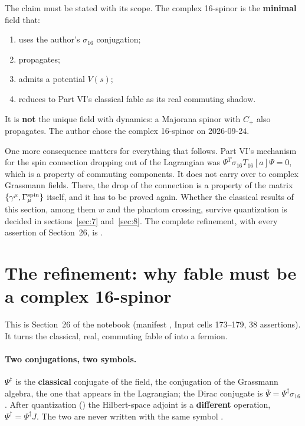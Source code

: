The claim must be stated with its scope. The complex 16-spinor is the \textbf{minimal} field
that:
\begin{enumerate}
  \item uses the author's $\sigma_{16}$ conjugation;
  \item propagates;
  \item admits a potential $V(s)$;
  \item reduces to Part VI's classical fable as its real commuting shadow.
\end{enumerate}
It is \textbf{not} the unique field with dynamics: a Majorana spinor with $C_+$ also propagates.
The author chose the complex 16-spinor on 2026-09-24.

One more consequence matters for everything that follows. Part VI's mechanism for the spin
connection dropping out of the Lagrangian was $\Psi^{T}\sigma_{16}T_{16}[a]\Psi=0$, which is a
property of commuting components. It does not carry over to complex Grassmann fields. There, the
drop of the connection is a property of the matrix $\{\gamma^\mu,\Gamma^{\rm spin}_\mu\}$ itself,
and it has to be proved again. Whether the classical results of this section, among them $w$ and
the phantom crossing, survive quantization is decided in sections~\ref{sec:7} and~\ref{sec:8}. The
complete refinement, with every assertion of Section~26, is .

\endgroup

\section{The refinement: why fable must be a complex 16-spinor}
\label{sec:3}

This is Section~26 of the notebook (manifest , Input cells
173--179, 38 assertions). It turns the classical, real, commuting fable of  into a
fermion.

\paragraph{Two conjugations, two symbols.} $\Psi^{\ddagger}$ is the \textbf{classical} conjugate of
the field, the conjugation of the Grassmann algebra, the one that appears in the Lagrangian; the
Dirac conjugate is $\bar\Psi=\Psi^{\ddagger}\sigma_{16}$. After quantization () the
Hilbert-space adjoint is a \textbf{different} operation, $\Psi^{\dagger}=\Psi^{\ddagger}J$. The two
are never written with the same symbol .

